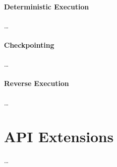 \paragraph{Deterministic Execution}
\label{par:futurework_simicsproductification_deterministicexecution}
\ldots

\paragraph{Checkpointing}
\label{par:futurework_simicsproductification_checkpointing}
\ldots

\paragraph{Reverse Execution}
\label{par:futurework_simicsproductification_reverseexecution}
\ldots

\section{API Extensions}
\label{sec:futurework_apiextensions}
\ldots


